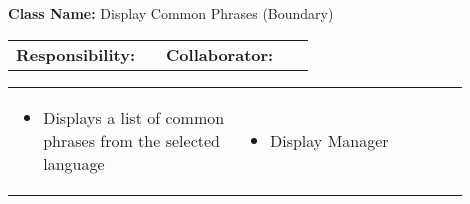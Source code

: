 \begin{cards}[]
    \textbf{Class Name:} Display Common Phrases (Boundary)
    \tcbline
    \begin{tabular}{p{0.45\linewidth} | p{0.45\linewidth}}
        \textbf{Responsibility:}& 
        \textbf{Collaborator:}\\
    \end{tabular}
    \tcbline
    \begin{tabular}{p{0.45\linewidth} | p{0.45\linewidth}}
        \begin{itemize}
            \item Displays a list of common phrases from the selected language
        \end{itemize}
        &
        \begin{itemize}
            \item Display Manager
        \end{itemize}
    \end{tabular}
\end{cards}